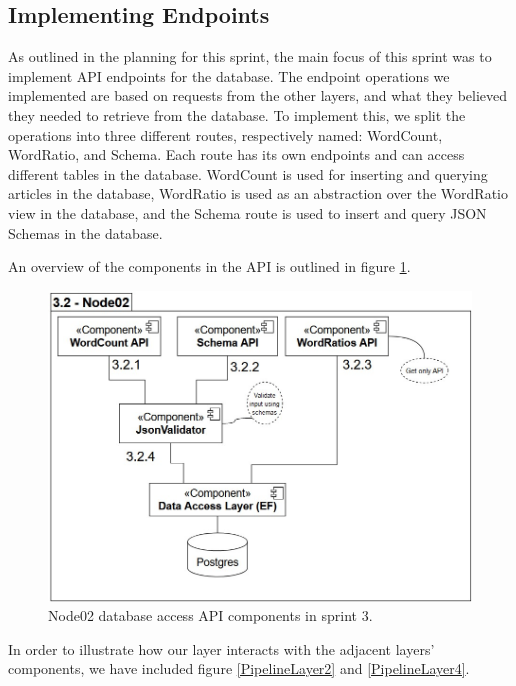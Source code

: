 \subsection{Implementing Endpoints}

As outlined in the planning for this sprint, the main focus of this sprint was to implement API endpoints for the database.
The endpoint operations we implemented are based on requests from the other layers, and what they believed they needed to retrieve from the database.
To implement this, we split the operations into three different routes, respectively named: WordCount, WordRatio, and Schema. Each route has its own endpoints and can access different tables in the database. WordCount is used for inserting and querying articles in the database, WordRatio is used as an abstraction over the WordRatio view in the database, and the Schema route is used to insert and query JSON Schemas in the database.

An overview of the components in the API is outlined in figure \ref{Node02Sprint3}.

\begin{figure}[h]
    \centering
    \includegraphics[width=\linewidth]{Images/Node02Pipeline.jpg}
    \caption{Node02 database access API components in sprint 3.}
    \label{Node02Sprint3}
\end{figure}

In order to illustrate how our layer interacts with the adjacent layers' components, we have included figure \ref{PipelineLayer2} and \ref{PipelineLayer4}.

